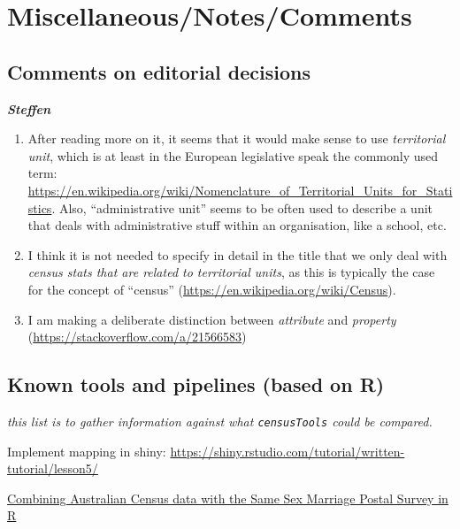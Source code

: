 \documentclass[12pt,]{article}
\providecommand{\tightlist}{%
  \setlength{\itemsep}{0pt}\setlength{\parskip}{0pt}}
\begin{document}
\hypertarget{miscellaneousnotescomments}{%
\section{Miscellaneous/Notes/Comments}\label{miscellaneousnotescomments}}

\hypertarget{comments-on-editorial-decisions}{%
\subsection{Comments on editorial decisions}\label{comments-on-editorial-decisions}}

\textbf{\emph{Steffen}}

\begin{enumerate}
\def\labelenumi{\arabic{enumi}.}
\tightlist
\item
  After reading more on it, it seems that it would make sense to use \emph{territorial unit}, which is at least in the European legislative speak the commonly used term: \url{https://en.wikipedia.org/wiki/Nomenclature_of_Territorial_Units_for_Statistics}.
  Also, ``administrative unit'' seems to be often used to describe a unit that deals with administrative stuff within an organisation, like a school, etc.
\item
  I think it is not needed to specify in detail in the title that we only deal with \emph{census stats that are related to territorial units}, as this is typically the case for the concept of ``census'' (\url{https://en.wikipedia.org/wiki/Census}).
\item
  I am making a deliberate distinction between \emph{attribute} and \emph{property} (\url{https://stackoverflow.com/a/21566583})
\end{enumerate}

\hypertarget{known-tools-and-pipelines-based-on-r}{%
\subsection{Known tools and pipelines (based on R)}\label{known-tools-and-pipelines-based-on-r}}

\emph{this list is to gather information against what \texttt{censusTools} could be compared.}

Implement mapping in shiny: \url{https://shiny.rstudio.com/tutorial/written-tutorial/lesson5/}

\href{https://medium.com/@miles.mcbain/combining-australian-census-data-with-the-same-sex-marriage-postal-survey-in-r-39d9b2082249}{Combining Australian Census data with the Same Sex Marriage Postal Survey in R}
\end{document}
